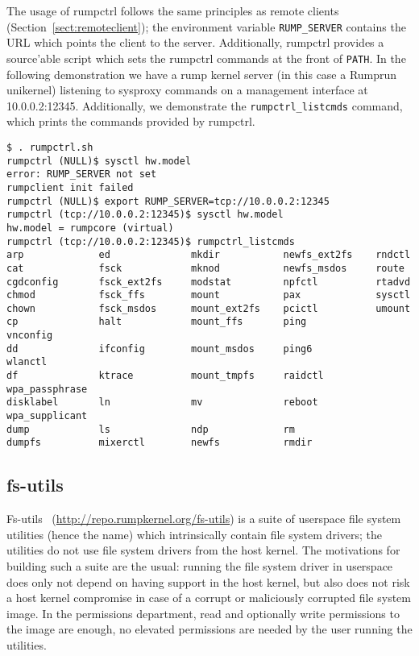 The usage of rumpctrl follows the same principles as remote clients
(Section~\ref{sect:remoteclient}); the environment variable
\verb+RUMP_SERVER+ contains the URL which points the client to the
server.  Additionally, rumpctrl provides a source'able script which sets
the rumpctrl commands at the front of \verb+PATH+.
In the following demonstration we have a rump
kernel server (in this case a Rumprun unikernel) listening
to sysproxy commands on a management interface at 10.0.0.2:12345.
Additionally, we demonstrate the \verb+rumpctrl_listcmds+ command,
which prints the commands provided by rumpctrl.

{\scriptsize
\begin{verbatim}
$ . rumpctrl.sh
rumpctrl (NULL)$ sysctl hw.model
error: RUMP_SERVER not set
rumpclient init failed
rumpctrl (NULL)$ export RUMP_SERVER=tcp://10.0.0.2:12345
rumpctrl (tcp://10.0.0.2:12345)$ sysctl hw.model
hw.model = rumpcore (virtual)
rumpctrl (tcp://10.0.0.2:12345)$ rumpctrl_listcmds
arp             ed              mkdir           newfs_ext2fs    rndctl
cat             fsck            mknod           newfs_msdos     route
cgdconfig       fsck_ext2fs     modstat         npfctl          rtadvd
chmod           fsck_ffs        mount           pax             sysctl
chown           fsck_msdos      mount_ext2fs    pcictl          umount
cp              halt            mount_ffs       ping            vnconfig
dd              ifconfig        mount_msdos     ping6           wlanctl
df              ktrace          mount_tmpfs     raidctl         wpa_passphrase
disklabel       ln              mv              reboot          wpa_supplicant
dump            ls              ndp             rm
dumpfs          mixerctl        newfs           rmdir
\end{verbatim}}

\subsection{fs-utils}
\label{sect:fs-utils}

Fs-utils~\cite{ysmal:fs-utils} (\url{http://repo.rumpkernel.org/fs-utils})
is a suite of userspace file system utilities (hence the name) which
intrinsically contain file system drivers; the utilities
do not use file system drivers from the host kernel.  The motivations
for building such a suite are the usual: running the file system driver
in userspace does only not depend on having support in the host kernel,
but also does not risk a host kernel compromise in case of a corrupt or
maliciously corrupted file system image.  In the permissions department,
read and optionally write permissions to the image are enough, no elevated
permissions are needed by the user running the utilities.

